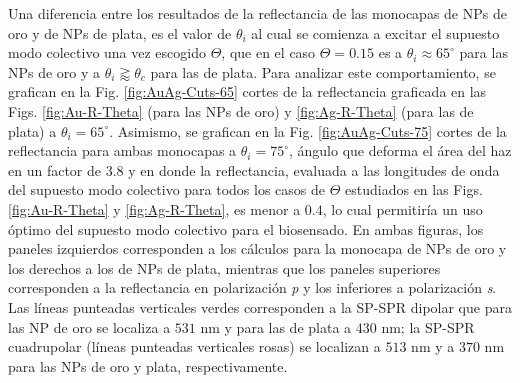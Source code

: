 Una diferencia entre los resultados de la reflectancia de las monocapas de NPs de oro y de NPs de plata, es el valor de $\theta_i$ al cual se comienza a excitar el supuesto modo colectivo una vez escogido $\Theta$, que en el caso  $\Theta=0.15$ es a $\theta_i\approx 65^\circ$ para las NPs de oro y a $\theta_i\gtrapprox\theta_c$ para las de plata. Para analizar este comportamiento, se grafican en la Fig. \ref{fig:AuAg-Cuts-65} cortes de la reflectancia graficada en las Figs. \ref{fig:Au-R-Theta} (para las NPs de oro) y \ref{fig:Ag-R-Theta} (para las de plata) a $\theta_i=65^\circ$. Asimismo, se grafican en la Fig. \ref{fig:AuAg-Cuts-75} cortes de la reflectancia para ambas monocapas a $\theta_i=75^\circ$, ángulo que deforma el área del haz en un factor de $3.8$ y en donde  la reflectancia, evaluada a las longitudes de onda del supuesto modo colectivo para todos los casos de $\Theta$ estudiados en las Figs.  \ref{fig:Au-R-Theta} y  \ref{fig:Ag-R-Theta}, es menor a $0.4$, lo cual permitiría un uso óptimo  del supuesto modo colectivo para el biosensado. En ambas figuras, los paneles izquierdos corresponden a los cálculos para la monocapa de NPs de oro y los derechos a los de NPs de plata, mientras que los paneles superiores corresponden a la reflectancia en polarización \emph{p} y los inferiores a polarización \emph{s}. Las líneas punteadas verticales verdes corresponden a la SP-SPR dipolar que para las NP de oro se localiza a $531$ nm y para las de plata a $430$ nm; la SP-SPR cuadrupolar (líneas punteadas verticales rosas) se localizan a $513$ nm y a $370$ nm para las NPs de oro y plata, respectivamente.

